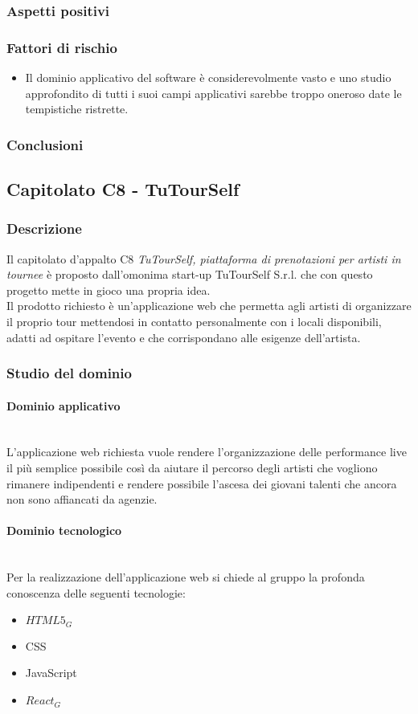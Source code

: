 		\subsubsection{Aspetti positivi}
		\subsubsection{Fattori di rischio}
		\begin{itemize}
			\item Il dominio applicativo del software è considerevolmente vasto e uno studio approfondito di tutti i suoi campi applicativi sarebbe troppo oneroso date le tempistiche ristrette.
		\end{itemize}
		\subsubsection{Conclusioni}
	
	\subsection{Capitolato C8 - TuTourSelf}
		\subsubsection{Descrizione}
		Il capitolato d'appalto C8 \emph{TuTourSelf, piattaforma di prenotazioni per artisti in tournee} è proposto dall'omonima start-up TuTourSelf S.r.l. che con questo progetto mette in gioco una propria idea.\\ Il prodotto richiesto è un'applicazione web che permetta agli artisti di organizzare il proprio tour mettendosi in contatto personalmente con i locali disponibili, adatti ad ospitare l'evento e che corrispondano alle esigenze dell'artista. 
		\subsubsection{Studio del dominio}
			\paragraph{Dominio applicativo}
			\mbox{}\\
			L'applicazione web richiesta vuole rendere l’organizzazione delle performance live il più semplice possibile così da aiutare il percorso degli artisti che vogliono rimanere indipendenti e rendere possibile l'ascesa dei giovani talenti che ancora non sono affiancati da agenzie.
			\paragraph{Dominio tecnologico}
			\mbox{}\\
			Per la realizzazione dell'applicazione web si chiede al gruppo la profonda conoscenza delle seguenti tecnologie:
			\begin{itemize}
				\item $HTML5_G$
				\item CSS
				\item JavaScript
				\item $React_G$
			\end{itemize}
